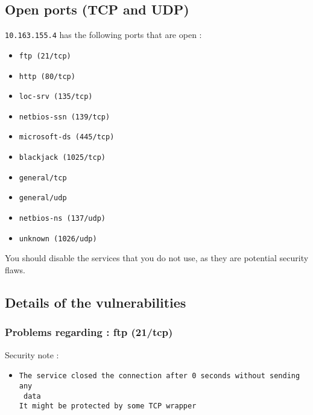 \documentclass{article}
\begin{document}
\subsection{Open ports (TCP and UDP)}
\verb+10.163.155.4+ has the following ports that are open : 
\begin{itemize}
\item\verb+ftp (21/tcp)+
\item\verb+http (80/tcp)+
\item\verb+loc-srv (135/tcp)+
\item\verb+netbios-ssn (139/tcp)+
\item\verb+microsoft-ds (445/tcp)+
\item\verb+blackjack (1025/tcp)+
\item\verb+general/tcp+
\item\verb+general/udp+
\item\verb+netbios-ns (137/udp)+
\item\verb+unknown (1026/udp)+
\end{itemize}
You should disable the services that you do not use, as they are potential security flaws.
\subsection{Details of the vulnerabilities}
\subsubsection{Problems regarding : ftp (21/tcp)}
Security note :\\
\begin{itemize}
\item \begin{verbatim}
The service closed the connection after 0 seconds without sending any
 data
It might be protected by some TCP wrapper

\end{verbatim}\end{itemize}
\end{document}
